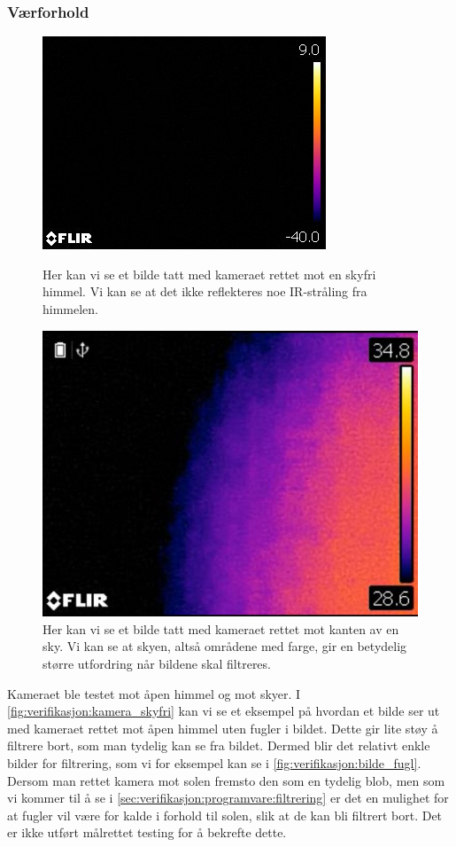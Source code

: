 \newpage
\subsubsection{Værforhold}\label{sec:verifikasjon:kamera:værforhold}

\begin{figure}
    \centering
    \includegraphics[width=.42\textwidth]{verifikasjon-test/Kamera/skyfri.jpg}
    \caption{Her kan vi se et bilde tatt med kameraet rettet mot en skyfri himmel. Vi kan se at det ikke reflekteres noe IR-stråling fra himmelen.}
    \label{fig:verifikasjon:kamera_skyfri}
    \vspace{0.5cm}
    
    \includegraphics[width=.42\textwidth]{verifikasjon-test/Kamera/skyer3.JPG}
    \caption{Her kan vi se et bilde tatt med kameraet rettet mot kanten av en sky. Vi kan se at skyen, altså områdene med farge, gir en betydelig større utfordring når bildene skal filtreres.}
    \label{fig:verifikasjon:kamera_skyer}
\end{figure}


Kameraet ble testet mot åpen himmel og mot skyer. 
I \autoref{fig:verifikasjon:kamera_skyfri} kan vi se et eksempel på hvordan et bilde ser ut med kameraet rettet mot åpen himmel uten fugler i bildet. 
Dette gir lite støy å filtrere bort, som man tydelig kan se fra bildet. 
Dermed blir det relativt enkle bilder for filtrering, som vi for eksempel kan se i \autoref{fig:verifikasjon:bilde_fugl}. 
Dersom man rettet kamera mot solen fremsto den som en tydelig blob, men som vi kommer til å se i \autoref{sec:verifikasjon:programvare:filtrering} er det en mulighet for at fugler vil være for kalde i forhold til solen, slik at de kan bli filtrert bort.
Det er ikke utført målrettet testing for å bekrefte dette.

